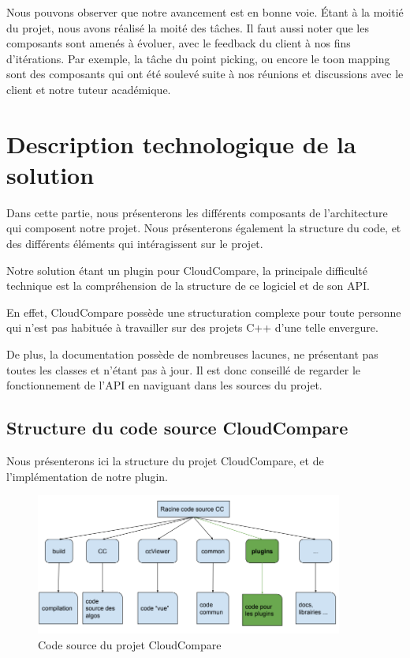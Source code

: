 \documentclass[12pt,titlepage,french]{article}
\begin{document}
Nous pouvons observer que notre avancement est en bonne voie. Étant à la moitié du projet, nous avons réalisé la moité des tâches. Il faut aussi noter que les composants sont amenés à évoluer, avec le feedback du client à nos fins d'itérations. Par exemple, la tâche du point picking, ou encore le toon mapping sont des composants qui ont été soulevé suite à nos réunions et discussions avec le client et notre tuteur académique.

\section{Description technologique de la solution}

Dans cette partie, nous présenterons les différents composants de l'architecture qui composent notre projet. Nous présenterons également la structure du code, et des différents éléments qui intéragissent sur le projet.

Notre solution étant un plugin pour CloudCompare, la principale difficulté technique est la compréhension de la structure de ce logiciel et de son API. \newline

En effet, CloudCompare possède une structuration complexe pour toute personne qui n'est pas habituée à travailler sur des projets C++ d'une telle envergure.

De plus, la documentation possède de nombreuses lacunes, ne présentant pas toutes les classes et n'étant pas à jour.
Il est donc conseillé de regarder le fonctionnement de l'API en naviguant dans les sources du projet.

\subsection{Structure du code source CloudCompare}

Nous présenterons ici la structure du projet CloudCompare, et de l'implémentation de notre plugin.

\begin{figure}[H]
\center
  \includegraphics[width=0.9\textwidth]{./img/structure_code.PNG}
  \caption{\label{} Code source du projet CloudCompare}
\end{figure}
\end{document}
